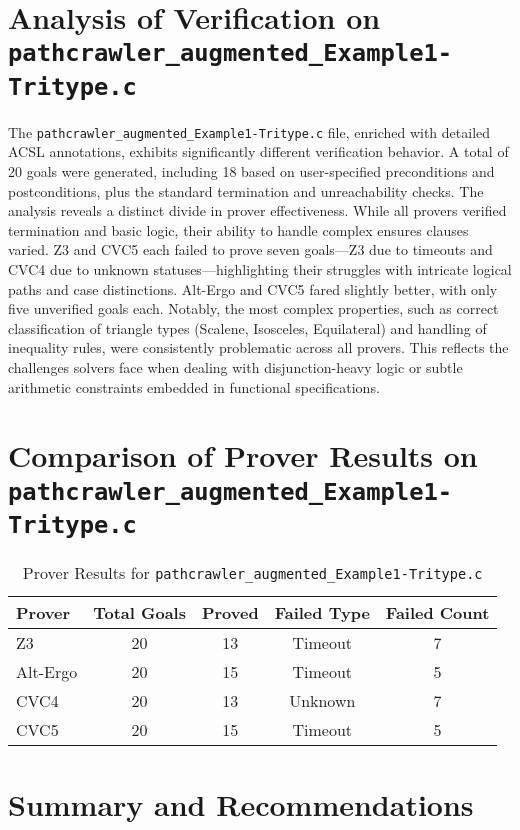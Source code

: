 \documentclass[12pt]{article}
\begin{document}
\section*{Analysis of Verification on \texttt{pathcrawler\_augmented\_Example1-Tritype.c}}

The \texttt{pathcrawler\_augmented\_Example1-Tritype.c} file, enriched with detailed ACSL annotations, exhibits significantly different verification behavior. A total of 20 goals were generated, including 18 based on user-specified preconditions and postconditions, plus the standard termination and unreachability checks. The analysis reveals a distinct divide in prover effectiveness. While all provers verified termination and basic logic, their ability to handle complex ensures clauses varied. Z3 and CVC5 each failed to prove seven goals—Z3 due to timeouts and CVC4 due to unknown statuses—highlighting their struggles with intricate logical paths and case distinctions. Alt-Ergo and CVC5 fared slightly better, with only five unverified goals each. Notably, the most complex properties, such as correct classification of triangle types (Scalene, Isosceles, Equilateral) and handling of inequality rules, were consistently problematic across all provers. This reflects the challenges solvers face when dealing with disjunction-heavy logic or subtle arithmetic constraints embedded in functional specifications.

\section*{Comparison of Prover Results on \texttt{pathcrawler\_augmented\_Example1-Tritype.c}}

\begin{table}[h]
\centering
\caption{Prover Results for \texttt{pathcrawler\_augmented\_Example1-Tritype.c}}
\begin{tabular}{@{}lcccc@{}}
\toprule
\textbf{Prover} & \textbf{Total Goals} & \textbf{Proved} & \textbf{Failed Type} & \textbf{Failed Count} \\ \midrule
Z3       & 20 & 13 & Timeout  & 7 \\
Alt-Ergo & 20 & 15 & Timeout  & 5 \\
CVC4     & 20 & 13 & Unknown  & 7 \\
CVC5     & 20 & 15 & Timeout  & 5 \\
\bottomrule
\end{tabular}
\end{table}

\section*{Summary and Recommendations}
\end{document}
